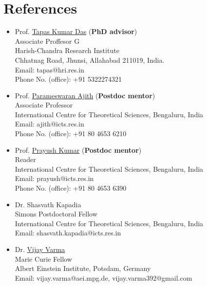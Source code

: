 \documentclass[12pt]{article}
\begin{document}
\section{References}
\begin{itemize}
\item Prof. \href{http://www.hri.res.in/people/Physics/tapas}{Tapas Kumar Das} ({\bfseries PhD advisor})\\
  Associate Proffesor G\\
  Harish-Chandra Research Institute\\
  Chhatnag Road, Jhunsi, Allahabad 211019, India.\\
  Email: {tapas@hri.res.in}\\
  Phone No. (office): +91 5322274321
  
\item Prof. \href{https://home.icts.res.in/~ajith/Home.html}{Parameswaran Ajith} ({\bfseries Postdoc mentor})\\
  Associate Professor\\
  International Centre for Theoretical Sciences, Bengaluru, India\\
  Email: {ajith@icts.res.in}\\
  Phone No. (office): +91 80 4653 6210

\item Prof. \href{https://www.icts.res.in/people/prayush-kumar-0}{Prayush Kumar} ({\bfseries Postdoc mentor})\\
  Reader\\
  International Centre for Theoretical Sciences, Bengaluru, India\\
  Email: {prayush@icts.res.in}\\
  Phone No. (office): +91 80 4653 6390

\item Dr. {Shasvath Kapadia}\\
  Simons Postdoctoral Fellow\\
  International Centre for Theoretical Sciences, Bengaluru, India\\
  Email: {shasvath.kapadia@icts.res.in}
  
\item Dr. \href{https://vijayvarma.com/}{Vijay Varma}\\
  Marie Curie Fellow\\
  Albert Einstein Institute, Potsdam, Germany\\
  Email: vijay.varma@aei.mpg.de, vijay.varma392@gmail.com

\end{itemize}
\end{document}
